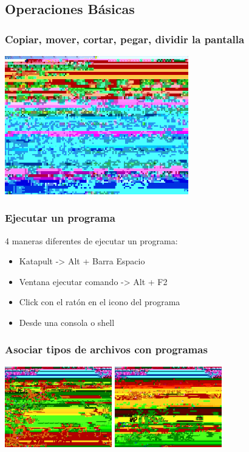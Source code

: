 \subsection{Operaciones Básicas}
\frame
{
	\frametitle{Copiar, mover, cortar, pegar, dividir la pantalla}
	\begin{center}
		\includegraphics[width=8cm]{./imgs/konqueror-file}
	\end{center}
}
\frame
{
	\frametitle{Ejecutar un programa}
	4 maneras diferentes de ejecutar un programa:
	\begin{itemize}
		\item Katapult -> Alt + Barra Espacio 
		\item Ventana ejecutar comando -> Alt + F2
		\item Click con el ratón en el icono del programa
		\item Desde una consola o shell
	\end{itemize}
}
\frame
{
	\frametitle{Asociar tipos de archivos con programas}
	\begin{center}
		\includegraphics[height=3.5cm]{./imgs/konqueror-preferencias-general}
		\includegraphics[height=3.5cm]{./imgs/konqueror-asociacion-mime}
	\end{center}
}

